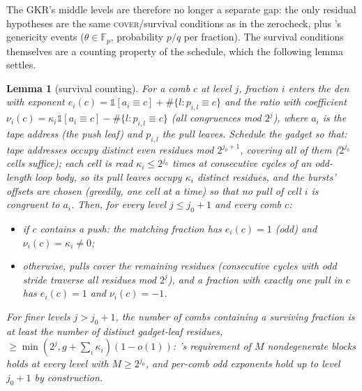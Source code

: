 \documentclass{article}
\newcommand{\Fp}{\mathbb{F}_p}
\newtheorem{lemma}[theorem]{Lemma}
\theoremstyle{definition}
\begin{document}
The GKR's middle levels are therefore no longer a separate gap: the only residual hypotheses are the same \textsc{cover}/survival conditions as in the zerocheck, plus 's genericity events ($\theta \in \Fp$, probability $p/q$ per fraction). The survival conditions themselves are a counting property of the schedule, which the following lemma settles.

\begin{lemma}[survival counting]\label{lem:schedule}
For a comb $c$ at level $j$, fraction $i$ enters the den with exponent $e_i(c) = \mathbb{1}[a_i \equiv c] + \#\{l : p_{i,l} \equiv c\}$ and the ratio with coefficient $\nu_i(c) = \kappa_i \mathbb{1}[a_i \equiv c] - \#\{l : p_{i,l} \equiv c\}$ (all congruences mod $2^j$), where $a_i$ is the tape address (the push leaf) and $p_{i,l}$ the pull leaves. Schedule the gadget so that: tape addresses occupy distinct \emph{even} residues mod $2^{j_0+1}$, covering all of them ($2^{j_0}$ cells suffice); each cell is read $\kappa_i \leq 2^{j_0}$ times at consecutive cycles of an \emph{odd-length} loop body, so its pull leaves occupy $\kappa_i$ \emph{distinct} residues, and the bursts' offsets are chosen (greedily, one cell at a time) so that no pull of cell $i$ is congruent to $a_i$. Then, for every level $j \leq j_0 + 1$ and every comb $c$:
\begin{itemize}
    \item if $c$ contains a push: the matching fraction has $e_i(c) = 1$ (odd) and $\nu_i(c) = \kappa_i \neq 0$;
    \item otherwise, pulls cover the remaining residues (consecutive cycles with odd stride traverse all residues mod $2^j$), and a fraction with exactly one pull in $c$ has $e_i(c) = 1$ and $\nu_i(c) = -1$.
\end{itemize}
For finer levels $j > j_0 + 1$, the number of combs containing a surviving fraction is at least the number of distinct gadget-leaf residues, $\geq \min(2^j, g + \sum_i \kappa_i)(1 - o(1))$: 's requirement of $M$ nondegenerate blocks holds at every level with $M \geq 2^{j_0}$, and per-comb odd exponents hold up to level $j_0 + 1$ by construction.
\end{lemma}
\end{document}

